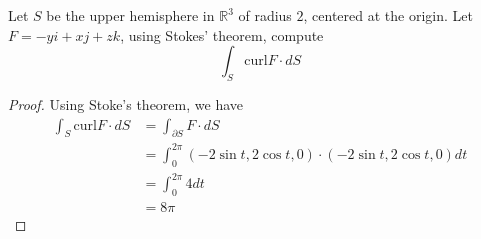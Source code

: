 \documentclass[openany]{book}
\newcommand{\R}{\mathbb{R}}
\begin{document}
\begin{prob}
    Let $S$ be the upper hemisphere in $\R^3$ of radius $2$, centered at the origin. Let $F=-yi+xj+zk$, using Stokes' theorem, compute 
    \begin{equation*}
        \int_S\text{curl}F\cdot dS
    \end{equation*}
\end{prob}
\begin{proof}
    Using Stoke's theorem, we have 
    \begin{align*}
        \int_S\text{curl}F\cdot dS&=\int_{\partial S}F\cdot dS\\
        &=\int_0^{2\pi}(-2\sin t, 2\cos t, 0)\cdot (-2\sin t, 2\cos t, 0)dt\\
        &=\int_0^{2\pi}4dt\\
        &=8\pi
    \end{align*}
\end{proof}
\end{document}
